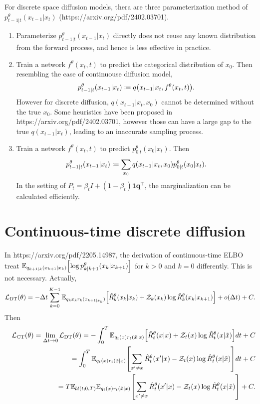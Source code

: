 \documentclass[10pt]{article}
\begin{document}
For discrete space diffusion models, thera are three parameterization method of $p_{t-1|t}^\theta(x_{t-1}|x_t)$ (https://arxiv.org/pdf/2402.03701).
\begin{enumerate}
  \item Parameterize $p_{t-1|t}^\theta(x_{t-1}|x_t)$ directly does not reuse any known distribution from the forward process, and hence is less effective in practice.
  \item Train a network $f^\theta(x_t,t)$ to predict the categorical distribution of $x_0$. Then resembling the case of continuouse diffusion model,
  \begin{eqnarray*}
    p_{t-1|t}^\theta(x_{t-1}|x_t)\coloneq q\qty(x_{t-1}|x_t,f^\theta(x_t,t)).
  \end{eqnarray*}
  However for discrete diffusion, $q(x_{t−1}|x_t,x_0)$ cannot be determined without the true $x_0$. Some heuristics have been proposed in https://arxiv.org/pdf/2402.03701, however those can have a large gap to the true $q(x_{t−1}|x_t)$, leading to an inaccurate sampling process.
  \item Train a network $f^\theta(x_t,t)$ to predict $p_{0|t}^\theta(x_0|x_t)$. Then
  \begin{eqnarray*}
    p_{t-1|t}^\theta(x_{t-1}|x_t)\coloneq \sum_{x_0}q\qty(x_{t-1}|x_t,x_0)p_{0|t}^\theta(x_0|x_t).
  \end{eqnarray*}
  In the setting of $P_t=\beta_t I + (1-\beta_t)\mathbf{1q}^\top$, the marginalization can be calculated efficiently.
\end{enumerate}

\section{Continuous-time discrete diffusion}
In https://arxiv.org/pdf/2205.14987, the derivation of continuous-time ELBO treat $\mathbb{E}_{q_{k+1|k}(x_{k+1}|x_k)}\qty[\log p_{k|k+1}^\theta(x_k|x_{k+1})]$ for $k>0$ and $k=0$ differently. This is not necessary. Actually,
\begin{eqnarray*}
  \mathcal{L}_\text{DT}(\theta) = -\Delta t\sum_{k=0}^{K-1}\mathbb{E}_{q_k{x_k}r_k(x_{k+1|x_k})}\qty[\hat{R}_k^\theta(x_k|x_k) + \mathcal{Z}_k(x_k)\log\hat{R}_k^\theta(x_k|x_{k+1})] + o(\Delta t) + C.
\end{eqnarray*}
Then
\begin{eqnarray*}
  &&\mathcal{L}_\text{CT}(\theta) = \lim_{\Delta t\to 0}\mathcal{L}_\text{DT}(\theta) = - \int_0^T \mathbb{E}_{q_t(x)r_t(\tilde{x}|x)}\qty[\hat{R}_t^\theta(x|x) + \mathcal{Z}_t(x)\log\hat{R}_t^\theta(x|\tilde{x})]dt + C\\
  &&=\int_0^T \mathbb{E}_{q_t(x)r_t(\tilde{x}|x)}\qty[\sum_{x'\neq x}\hat{R}_t^\theta(x'|x) - \mathcal{Z}_t(x)\log\hat{R}_t^\theta(x|\tilde{x})]dt + C\\
  &&=T\mathbb{E}_{\mathcal{U}(t;0,T)}\mathbb{E}_{q_t(x)r_t(\tilde{x}|x)}\qty[\sum_{x'\neq x}\hat{R}_t^\theta(x'|x) - \mathcal{Z}_t(x)\log\hat{R}_t^\theta(x|\tilde{x})] + C.
\end{eqnarray*}
\end{document}
